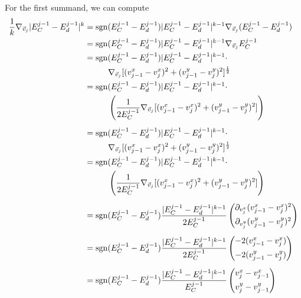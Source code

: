 \begin{proposition}
	For the first summand, we can compute 
	\begin{align*}
		\frac{1}{k} \nabla_{\vec{v}_{j}} |E^{j-1}_{C} - E^{j-1}_d|^k 
		&= \operatorname{sgn}(E^{j-1}_C - E^{j-1}_d) |E^{j-1}_C - E^{j-1}_d|^{k-1} \nabla_{\vec{v}_j} (E^{j-1}_C - E^{j-1}_d) \\
		&= \operatorname{sgn}(E^{j-1}_C - E^{j-1}_d) |E^{j-1}_C - E^{j-1}_d|^{k-1} \nabla_{\vec{v}_j} E^{j-1}_C \\
		&= \operatorname{sgn}(E^{j-1}_C - E^{j-1}_d) |E^{j-1}_C - E^{j-1}_d|^{k-1} \cdot\\
		& \hspace{1cm} \nabla_{\vec{v}_j} [(v_{j-1}^{x} - v_{j}^{x})^2 + (v_{j-1}^{y} - v_{j}^{y})^2]^{\frac{1}{2}}\\
		&= \operatorname{sgn}(E^{j-1}_C - E^{j-1}_d) |E^{j-1}_C - E^{j-1}_d|^{k-1} \cdot    \\
		& \hspace{1cm} \left(\frac{1}{2 E^{j-1}_C} \nabla_{\vec{v}_j} [(v_{j-1}^{x} - v_{j}^{x})^2 + (v_{j-1}^{y} - v_{j}^{y})^2]\right) \\[0.5em] 
		&= \operatorname{sgn}(E^{j-1}_C - E^{j-1}_d) |E^{j-1}_C - E^{j-1}_d|^{k-1} \cdot\\
		& \hspace{1cm} \nabla_{\vec{v}_j} [(v_{j-1}^{x} - v_{j}^{x})^2 + (v_{j-1}^{y} - v_{j}^{y})^2]^{\frac{1}{2}}\\
		&= \operatorname{sgn}(E^{j-1}_C - E^{j-1}_d) |E^{j-1}_C - E^{j-1}_d|^{k-1} \cdot    \\
		& \hspace{1cm} \left(\frac{1}{2 E^{j-1}_C} \nabla_{\vec{v}_j} [(v_{j-1}^{x} - v_{j}^{x})^2 + (v_{j-1}^{y} - v_{j}^{y})^2]\right) \\[0.5em] 
		&= \operatorname{sgn}(E^{j-1}_C - E^{j-1}_d) \frac{|E^{j-1}_C - E^{j-1}_d|^{k-1}}{2 E^{j-1}_C} \begin{pmatrix}
			\partial_{v_{j}^{x}} (v_{j-1}^{x} - v_{j}^{x})^2 \\[0.5em]
			\partial_{v_{j}^{y}} (v_{j-1}^{y} - v_{j}^{y})^2
		\end{pmatrix} \\[0.5em]
		&= \operatorname{sgn}(E^{j-1}_C - E^{j-1}_d) \frac{|E^{j-1}_C - E^{j-1}_d|^{k-1}}{2 E^{j-1}_C} \begin{pmatrix}
			 -2(v_{j-1}^{x} - v_{j}^{x}) \\[0.5em]
			 -2(v_{j-1}^{y} - v_{j}^{y})
		\end{pmatrix} \\[0.5em] 
		&= \operatorname{sgn}(E^{j-1}_C - E^{j-1}_d) \frac{ |E^{j-1}_C - E^{j-1}_d|^{k-1}}{E^{j-1}_C} \begin{pmatrix}
				v_{j}^{x} - v_{j-1}^{x} \\[0.5em]
				v_{j}^{y} - v_{j-1}^{y}
		\end{pmatrix}
	\end{align*}


\end{proposition}
